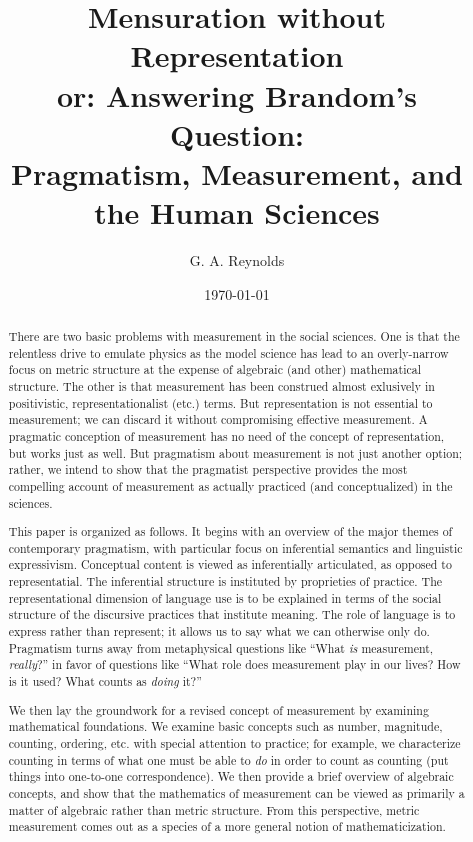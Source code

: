 \documentclass[11pt,twoside]{article}
\title{Mensuration without Representation \\
or: Answering Brandom's Question: \\
Pragmatism, Measurement, and the Human Sciences}
\author{G. A. Reynolds}
\date{\today}
\begin{document}
\maketitle
\nocite{*}

\begin{abstract}

  There are two basic problems with measurement in the social
  sciences.  One is that the relentless drive to emulate physics as
  the model science has lead to an overly-narrow focus on metric
  structure at the expense of algebraic (and other) mathematical
  structure.  The other is that measurement has been construed almost
  exlusively in positivistic, representationalist (etc.) terms.  But
  representation is not essential to measurement; we can discard it
  without compromising effective measurement.  A pragmatic conception
  of measurement has no need of the concept of representation, but
  works just as well.  But pragmatism about measurement is not just
  another option; rather, we intend to show that the pragmatist
  perspective provides the most compelling account of measurement as
  actually practiced (and conceptualized) in the sciences.

  This paper is organized as follows.  It begins with an overview of
  the major themes of contemporary pragmatism, with particular focus
  on inferential semantics and linguistic expressivism.  Conceptual
  content is viewed as inferentially articulated, as opposed to
  representatial.  The inferential structure is instituted by
  proprieties of practice.  The representational dimension of language
  use is to be explained in terms of the social structure of the
  discursive practices that institute meaning.  The role of language
  is to express rather than represent; it allows us to say what we can
  otherwise only do.  Pragmatism turns away from metaphysical
  questions like ``What \textit{is} measurement, \textit{really}?'' in
  favor of questions like ``What role does measurement play in our
  lives?  How is it used?  What counts as \textit{doing} it?''

We then lay the groundwork for a revised concept of measurement by
examining mathematical foundations.  We examine basic concepts such as
number, magnitude, counting, ordering, etc. with special attention to
practice; for example, we characterize counting in terms of what one
must be able to \textit{do} in order to count as counting (put things
into one-to-one correspondence).  We then provide a brief overview of
algebraic concepts, and show that the mathematics of measurement can
be viewed as primarily a matter of algebraic rather than metric
structure.  From this perspective, metric measurement comes out as a
species of a more general notion of mathematicization.


\end{abstract}
\end{document}
